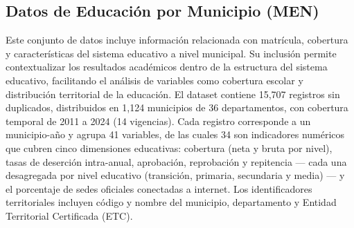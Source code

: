 \subsection{Datos de Educación por Municipio (MEN)}
Este conjunto de datos incluye información relacionada con matrícula, cobertura y características del sistema educativo a nivel municipal.
Su inclusión permite contextualizar los resultados académicos dentro de la estructura del sistema educativo, facilitando el análisis de variables como cobertura escolar y distribución territorial de la educación.
El dataset contiene 15,707 registros sin duplicados, distribuidos en 1,124 municipios de 36 departamentos, con cobertura temporal de 2011 a 2024 (14 vigencias). Cada registro corresponde a un municipio-año y agrupa 41 variables, de las cuales 34 son indicadores numéricos que cubren cinco dimensiones educativas: cobertura (neta y bruta por nivel), tasas de deserción intra-anual, aprobación, reprobación y repitencia — cada una desagregada por nivel educativo (transición, primaria, secundaria y media) — y el porcentaje de sedes oficiales conectadas a internet. Los identificadores territoriales incluyen código y nombre del municipio, departamento y Entidad Territorial Certificada (ETC).